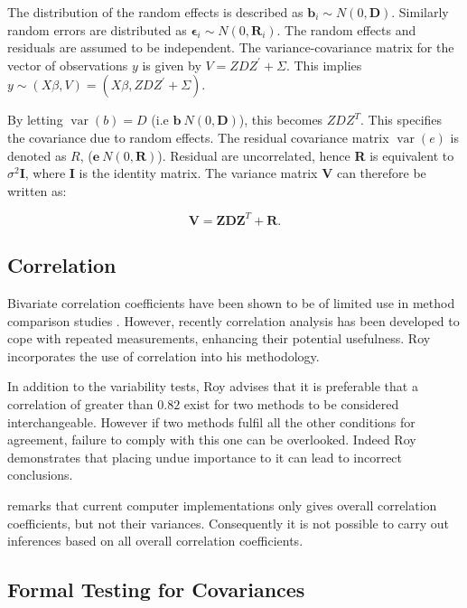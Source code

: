 \documentclass[12pt, a4paper]{report}
\theoremstyle{plain}
\theoremstyle{definition}
\theoremstyle{remark}
\begin{document}
		
		
		The distribution of the random effects is described as $\boldsymbol{b}_i \sim N(0,\boldsymbol{D})$. Similarly random errors are distributed as $\boldsymbol{\epsilon}_i \sim N(0,\boldsymbol{R}_i)$. The random effects and residuals are assumed to be independent. The variance-covariance matrix for the vector of observations $y$ is given by $V = ZDZ^{\prime}+ \Sigma.$ This implies $y \sim(X\beta, V) = (X\beta,ZDZ^{\prime}+ \Sigma)$. 
		
		
		By letting $\operatorname{var}(b) = D$ (i.e $\textbf{b} ~ N(0,\textbf{D})$), this becomes $ZDZ^{T}$. This specifies the covariance due to random
		effects. The residual covariance matrix $\operatorname{var}(e)$ is denoted as $R$, ($\textbf{e} ~ N(0,\textbf{R})$). Residual are uncorrelated,
		hence \textbf{R} is equivalent to $\sigma^{2}$\textbf{I}, where \textbf{I} is the identity matrix. The variance matrix \textbf{V}
		can therefore be written as:
		
		\begin{equation}
		\textbf{V}  = \textbf{ZDZ}^{T} + \textbf{R}.
		\end{equation}
		
		
		
		

\subsection{Correlation}	
Bivariate correlation coefficients have been shown to be of
limited use in method comparison studies \citep{BA86}. However,
recently correlation analysis has been developed to cope with
repeated measurements, enhancing their potential usefulness. Roy
incorporates the use of correlation into his methodology.


In addition to the variability tests, Roy advises that it is preferable that a correlation of greater than $0.82$ exist for two methods to be considered interchangeable. However if two methods fulfil all the other conditions for agreement, failure to comply with this one can be overlooked. Indeed Roy demonstrates that placing undue importance to it can lead to incorrect conclusions. 

\citet{ARoy2009} remarks that current computer implementations only gives overall correlation coefficients, but not their variances. Consequently it is not possible to carry out inferences based on all overall correlation coefficients.
	\subsection{Formal Testing for Covariances} %
	
\end{document}
